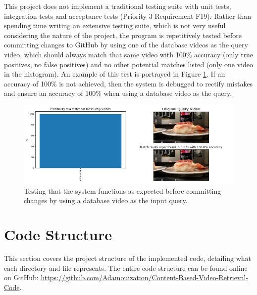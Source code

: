 This project does not implement a traditional testing suite with unit tests, integration tests and acceptance tests (Priority 3 Requirement F19). Rather than spending time writing an extensive testing suite, which is not very useful considering the nature of the project, the program is repetitively tested before committing changes to GitHub by using one of the database videos as the query video, which should always match that same video with 100\% accuracy (only true positives, no false positives) and no other potential matches listed (only one video in the histogram). An example of this test is portrayed in Figure \ref{fig:implementation-identity-query}. If an accuracy of 100\% is not achieved, then the system is debugged to rectify mistakes and ensure an accuracy of 100\% when using a database video as the query.

\begin{figure}[h] 
\centerline{\includegraphics[width=\textwidth]{figures/implementation/identity-query.png}}
\caption{\label{fig:implementation-identity-query}Testing that the system functions as expected before committing changes by using a database video as the input query.}
\end{figure}


\section{Code Structure}

This section covers the project structure of the implemented code, detailing what each directory and file represents. The entire code structure can be found online on GitHub: \url{https://github.com/Adamouization/Content-Based-Video-Retrieval-Code}.

